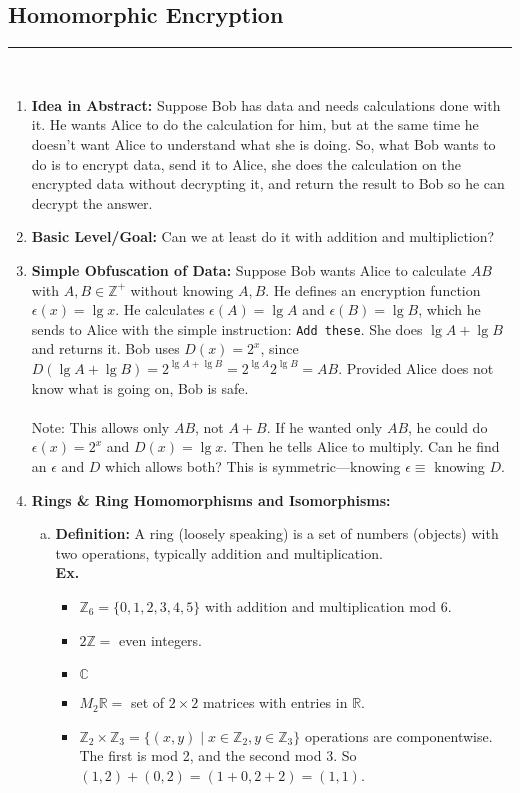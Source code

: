 \documentclass[class=article, crop=false]{standalone}
\def\reals{{\mathbb R}}
\def\complex{{\mathbb C}}
\def\integers{{\mathbb Z}}
\begin{document}
\subsection{Homomorphic Encryption}
\rule{\textwidth}{1pt}\\
\begin{enumerate}[1.]
	\item \textbf{Idea in Abstract:} Suppose Bob has data and needs calculations
	done with it. He wants Alice to do the calculation for him, but at the same time
	he doesn't want Alice to understand what she is doing. So, what Bob wants to do 
	is to encrypt data, send it to Alice, she
	does the calculation on the encrypted data without decrypting it,
	and return the result to Bob so he can decrypt the answer.

	\item \textbf{Basic Level/Goal:} Can we at least do it with addition and multipliction?
	
	\item \textbf{Simple Obfuscation of Data:} Suppose Bob wants Alice to 
	calculate $AB$ with $A,B\in\integers^+$ without knowing $A,B$.
	He defines an encryption function $\epsilon(x) =\lg x$.
	He calculates $\epsilon(A) = \lg A$ and $\epsilon(B) = \lg B$, which he sends to Alice
	with the simple instruction: \verb|Add these|. She does $\lg A + \lg B$ and returns it.
	Bob uses $D(x) = 2^x$, since $D(\lg A + \lg B) = 2^{\lg A + \lg B}= 2^{\lg A}2^{\lg B} = AB$.
	Provided Alice does not know what is going on, Bob is safe. \\\\
	Note: This allows only $AB$, not $A+B$. 
	If he wanted only $AB$, he could do $\epsilon(x)= 2^x$ and $D(x)=\lg x$.
	Then he tells Alice to multiply. Can he find an $\epsilon$ and $D$ which allows both?
	This is symmetric---knowing $\epsilon\equiv$ knowing $D$.

	\item \textbf{Rings \& Ring Homomorphisms and Isomorphisms:}
	\begin{enumerate}[(a)]
		\item \textbf{Definition:} A ring (loosely speaking) is a set of numbers (objects)
		with two operations, typically addition and multiplication. \\
		\textbf{Ex.}
		\begin{itemize}
			\item $\integers_6 = \{0,1,2,3,4,5\}$ with addition and multiplication mod 6.
			\item $2\integers =$ even integers. 
			\item $\complex$
			\item $M_2\reals = $ set of $2\times 2$ matrices with entries in $\reals$.
			\item $\integers_2\times\integers_3 = \{(x,y)\mid x\in\integers_2, y\in\integers_3\}$ operations are componentwise.
			The first is mod 2, and the second mod 3. So $(1,2) + (0, 2) = (1+0, 2+2) = (1,1)$.
		\end{itemize}


\end{enumerate}
\end{enumerate}
\end{document}
